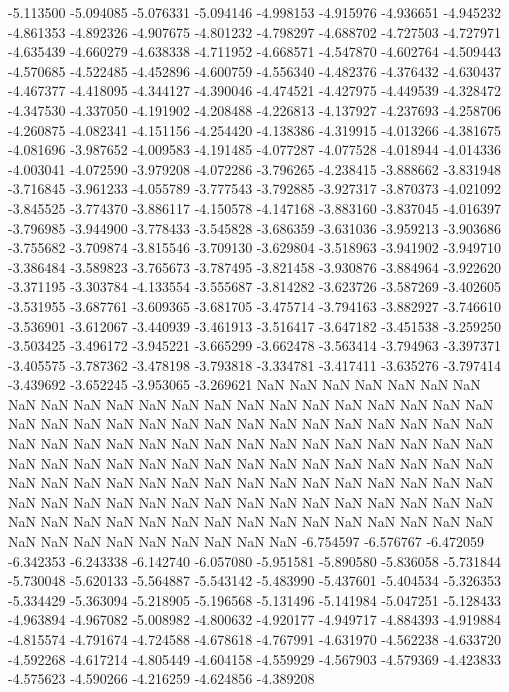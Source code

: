 -5.113500
-5.094085
-5.076331
-5.094146
-4.998153
-4.915976
-4.936651
-4.945232
-4.861353
-4.892326
-4.907675
-4.801232
-4.798297
-4.688702
-4.727503
-4.727971
-4.635439
-4.660279
-4.638338
-4.711952
-4.668571
-4.547870
-4.602764
-4.509443
-4.570685
-4.522485
-4.452896
-4.600759
-4.556340
-4.482376
-4.376432
-4.630437
-4.467377
-4.418095
-4.344127
-4.390046
-4.474521
-4.427975
-4.449539
-4.328472
-4.347530
-4.337050
-4.191902
-4.208488
-4.226813
-4.137927
-4.237693
-4.258706
-4.260875
-4.082341
-4.151156
-4.254420
-4.138386
-4.319915
-4.013266
-4.381675
-4.081696
-3.987652
-4.009583
-4.191485
-4.077287
-4.077528
-4.018944
-4.014336
-4.003041
-4.072590
-3.979208
-4.072286
-3.796265
-4.238415
-3.888662
-3.831948
-3.716845
-3.961233
-4.055789
-3.777543
-3.792885
-3.927317
-3.870373
-4.021092
-3.845525
-3.774370
-3.886117
-4.150578
-4.147168
-3.883160
-3.837045
-4.016397
-3.796985
-3.944900
-3.778433
-3.545828
-3.686359
-3.631036
-3.959213
-3.903686
-3.755682
-3.709874
-3.815546
-3.709130
-3.629804
-3.518963
-3.941902
-3.949710
-3.386484
-3.589823
-3.765673
-3.787495
-3.821458
-3.930876
-3.884964
-3.922620
-3.371195
-3.303784
-4.133554
-3.555687
-3.814282
-3.623726
-3.587269
-3.402605
-3.531955
-3.687761
-3.609365
-3.681705
-3.475714
-3.794163
-3.882927
-3.746610
-3.536901
-3.612067
-3.440939
-3.461913
-3.516417
-3.647182
-3.451538
-3.259250
-3.503425
-3.496172
-3.945221
-3.665299
-3.662478
-3.563414
-3.794963
-3.397371
-3.405575
-3.787362
-3.478198
-3.793818
-3.334781
-3.417411
-3.635276
-3.797414
-3.439692
-3.652245
-3.953065
-3.269621
NaN
NaN
NaN
NaN
NaN
NaN
NaN
NaN
NaN
NaN
NaN
NaN
NaN
NaN
NaN
NaN
NaN
NaN
NaN
NaN
NaN
NaN
NaN
NaN
NaN
NaN
NaN
NaN
NaN
NaN
NaN
NaN
NaN
NaN
NaN
NaN
NaN
NaN
NaN
NaN
NaN
NaN
NaN
NaN
NaN
NaN
NaN
NaN
NaN
NaN
NaN
NaN
NaN
NaN
NaN
NaN
NaN
NaN
NaN
NaN
NaN
NaN
NaN
NaN
NaN
NaN
NaN
NaN
NaN
NaN
NaN
NaN
NaN
NaN
NaN
NaN
NaN
NaN
NaN
NaN
NaN
NaN
NaN
NaN
NaN
NaN
NaN
NaN
NaN
NaN
NaN
NaN
NaN
NaN
NaN
NaN
NaN
NaN
NaN
NaN
NaN
NaN
NaN
NaN
NaN
NaN
NaN
NaN
NaN
NaN
NaN
NaN
NaN
NaN
NaN
NaN
NaN
NaN
NaN
NaN
NaN
-6.754597
-6.576767
-6.472059
-6.342353
-6.243338
-6.142740
-6.057080
-5.951581
-5.890580
-5.836058
-5.731844
-5.730048
-5.620133
-5.564887
-5.543142
-5.483990
-5.437601
-5.404534
-5.326353
-5.334429
-5.363094
-5.218905
-5.196568
-5.131496
-5.141984
-5.047251
-5.128433
-4.963894
-4.967082
-5.008982
-4.800632
-4.920177
-4.949717
-4.884393
-4.919884
-4.815574
-4.791674
-4.724588
-4.678618
-4.767991
-4.631970
-4.562238
-4.633720
-4.592268
-4.617214
-4.805449
-4.604158
-4.559929
-4.567903
-4.579369
-4.423833
-4.575623
-4.590266
-4.216259
-4.624856
-4.389208

